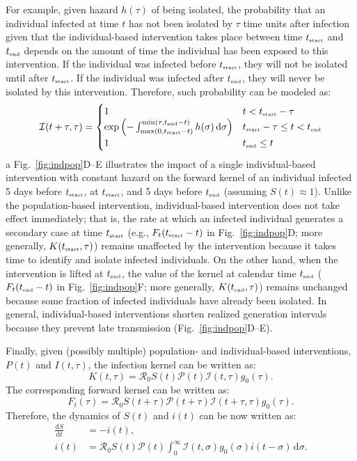 \documentclass[12pt]{article}
\newcommand{\fref}[1]{Fig.~\ref{fig:#1}}
\newcommand{\Rx}[1]{\ensuremath{{\mathcal R}_{#1}}\xspace}
\newcommand{\Ro}{\Rx{0}}
\newcommand{\tsub}[2]{#1_{{\textrm{\tiny #2}}}}
\newcommand{\dd}[1]{\ensuremath{\, \mathrm{d}#1}}
\newcommand{\dsigma}{\dd{\sigma}}
\newcommand{\tstart}{\ensuremath{\tsub{t}{start}}\xspace}
\newcommand{\tend}{\ensuremath{\tsub{t}{end}}\xspace}
\newcommand{\PP}{{\mathcal P}}
\newcommand{\II}{{\mathcal I}}
\begin{document}
For example, given hazard $h(\tau)$ of being isolated, the probability that an individual infected at time $t$ has not been isolated by $\tau$ time units after infection given that the individual-based intervention takes place between time \tstart and \tend depends on the amount of time the individual has been exposed to this intervention.
If the individual was infected before $\tstart$, they will not be isolated until after $\tstart$.
If the individual was infected after $\tend$, they will never be isolated by this intervention.
Therefore, such probability can be modeled as:
\begin{equation}
\II(t+\tau, \tau) = \begin{cases}
1 & t < \tstart-\tau \\
\exp\left(- \int_{\max(0, \tstart - t)}^{\min(\tau, \tend-t)} h(\sigma)\dd{\sigma} \right) & \tstart-\tau \leq t < \tend \\
1 & \tend \leq t
\end{cases}
\end{equation}a
\fref{indpop}D--E illustrates the impact of a single individual-based intervention with constant hazard on the forward kernel of an individual infected 5 days before $\tstart$, at $\tstart$, and 5 days before $\tend$ (assuming $S(t) \approx 1$).
Unlike the population-based intervention, individual-based intervention does not take effect immediately;
that is, the rate at which an infected individual generates a secondary case at time $\tstart$ (e.g., $F_t(\tstart-t)$ in \fref{indpop}D; more generally, $K(\tstart, \tau)$) remains unaffected by the intervention because it takes time to identify and isolate infected individuals.
On the other hand, when the intervention is lifted at $\tend$, the value of the kernel at calendar time $\tend$ ($F_t(\tend-t)$ in \fref{indpop}F; more generally, $K(\tend, \tau)$) remains unchanged because some fraction of infected individuals have already been isolated.
In general, individual-based interventions shorten realized generation intervals because they prevent late transmission (\fref{indpop}D--E).

Finally, given (possibly multiple) population- and individual-based interventions, $P(t)$ and $I(t, \tau)$, the infection kernel can be written as:
\begin{equation}
K(t, \tau) = \Ro S(t) \PP(t) \II(t,\tau) g_0(\tau).
\end{equation}
The corresponding forward kernel can be written as:
\begin{equation}
F_t(\tau) = \Ro S(t+\tau) \PP(t + \tau) \II(t+\tau, \tau) g_0(\tau).
\end{equation}
Therefore, the dynamics of $S(t)$ and $i(t)$ can be now written as:
\begin{equation}
\begin{aligned}
\frac{\mathrm{d}S}{\mathrm{d}t} &= - i(t),\\
i(t) &= \Ro S(t) \PP(t) \int_0^\infty \II(t, \sigma) g_0(\sigma) i(t-\sigma)\dsigma.
\end{aligned}
\end{equation}
\end{document}
